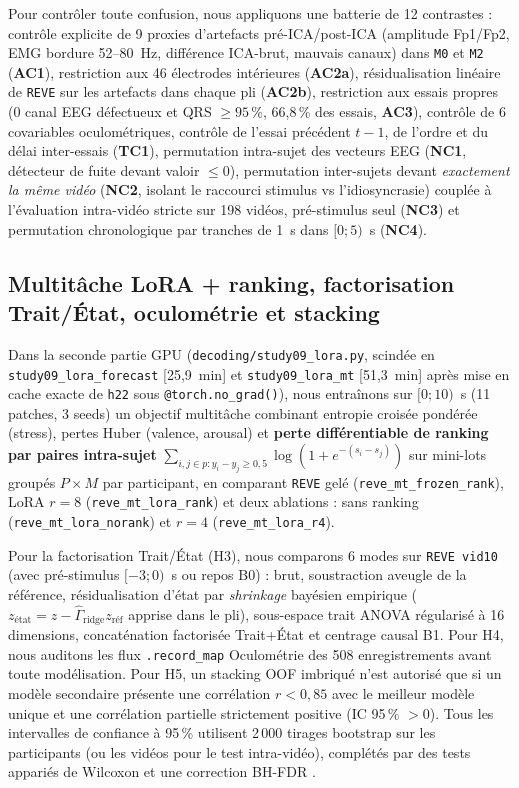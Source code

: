 \documentclass[10pt]{article}
\begin{document}
Pour contrôler toute confusion, nous appliquons une batterie de 12 contrastes : contrôle explicite de 9 proxies d'artefacts pré-ICA/post-ICA (amplitude Fp1/Fp2, EMG bordure 52--80~Hz, différence ICA-brut, mauvais canaux) dans \texttt{M0} et \texttt{M2} (\textbf{AC1}), restriction aux 46 électrodes intérieures (\textbf{AC2a}), résidualisation linéaire de \texttt{REVE} sur les artefacts dans chaque pli (\textbf{AC2b}), restriction aux essais propres (0 canal EEG défectueux et QRS $\ge 95\,\%$, 66,8\,\% des essais, \textbf{AC3}), contrôle de 6 covariables oculométriques, contrôle de l'essai précédent $t-1$, de l'ordre et du délai inter-essais (\textbf{TC1}), permutation intra-sujet des vecteurs EEG (\textbf{NC1}, détecteur de fuite devant valoir $\le 0$), permutation inter-sujets devant \emph{exactement la même vidéo} (\textbf{NC2}, isolant le raccourci stimulus vs l'idiosyncrasie) couplée à l'évaluation intra-vidéo stricte sur 198 vidéos, pré-stimulus seul (\textbf{NC3}) et permutation chronologique par tranches de 1~s dans $[0 ; 5)$~s (\textbf{NC4}).

\subsection{Multitâche LoRA + ranking, factorisation Trait/État, oculométrie et stacking}

Dans la seconde partie GPU (\texttt{decoding/\allowbreak study09\_lora.py}, scindée en \texttt{study09\_lora\_forecast} [25,9~min] et \texttt{study09\_lora\_mt} [51,3~min] après mise en cache exacte de \texttt{h22} sous \texttt{@torch.no\_grad()}), nous entraînons sur $[0 ; 10)$~s (11 patches, 3 seeds) un objectif multitâche combinant entropie croisée pondérée (stress), pertes Huber (valence, arousal) et \textbf{perte différentiable de ranking par paires intra-sujet} $\sum_{i,j \in p : y_i - y_j \ge 0{,}5} \log(1 + e^{-(s_i - s_j)})$ sur mini-lots groupés $P \times M$ par participant, en comparant \texttt{REVE} gelé (\texttt{reve\_mt\_frozen\_rank}), LoRA $r = 8$ (\texttt{reve\_mt\_lora\_rank}) et deux ablations : sans ranking (\texttt{reve\_mt\_lora\_norank}) et $r = 4$ (\texttt{reve\_mt\_lora\_r4}).

Pour la factorisation Trait/État (H3), nous comparons 6 modes sur \texttt{REVE vid10} (avec pré-stimulus $[-3 ; 0)$~s ou repos B0) : brut, soustraction aveugle de la référence, résidualisation d'état par \emph{shrinkage} bayésien empirique ($z_{\text{état}} = z - \hat{\Gamma}_{\text{ridge}} z_{\text{réf}}$ apprise dans le pli), sous-espace trait ANOVA régularisé à 16 dimensions, concaténation factorisée Trait+État et centrage causal B1. Pour H4, nous auditons les flux \texttt{.record\_map} Oculométrie des 508 enregistrements avant toute modélisation. Pour H5, un stacking OOF imbriqué n'est autorisé que si un modèle secondaire présente une corrélation $r < 0{,}85$ avec le meilleur modèle unique et une corrélation partielle strictement positive (IC 95\,\% $> 0$). Tous les intervalles de confiance à 95\,\% utilisent 2\,000 tirages bootstrap sur les participants (ou les vidéos pour le test intra-vidéo), complétés par des tests appariés de Wilcoxon et une correction BH-FDR \cite{varoquaux2018}.
\end{document}
